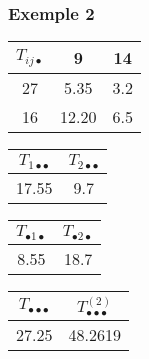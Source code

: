 \documentclass[12pt,t]{beamer}
\theoremstyle{plain}
\theoremstyle{definition}
\begin{document}
\begin{frame}
\frametitle{Exemple 2}
\begin{center}
\begin{tabular}{c|cc}
$T_{ij\bullet}$ & 9 & 14\\ \hline
27 &  5.35 & 3.2\\
16 &12.20 & 6.5
\end{tabular}
\medskip

\begin{tabular}{cc}
$T_{1\bullet\bullet}$ & $T_{2\bullet\bullet}$ \\ \hline
17.55 &  9.7
\end{tabular}
\quad
\begin{tabular}{cc}
$T_{\bullet 1\bullet}$ & $T_{\bullet 2\bullet}$ \\ \hline
8.55 & 18.7
\end{tabular}
\quad
\begin{tabular}{cc}
$T_{\bullet\bullet\bullet}$ & $T_{\bullet\bullet\bullet}^{(2)}$ \\ \hline
27.25 & 48.2619
\end{tabular}
\bigskip

\end{center}


\end{frame}
\end{document}
